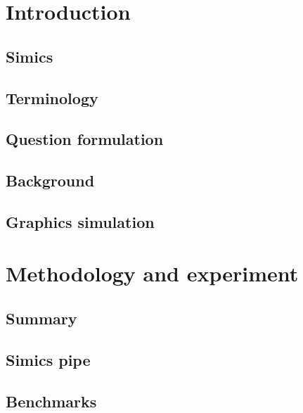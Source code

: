 \documentclass{beamer} %
\begin{document}
	

	\section{Introduction}

	\subsection{Simics}
	

        \subsection{Terminology}
        
        

	\subsection{Question formulation}
	

        \subsection{Background}
        
        

	\subsection{Graphics simulation}
	

        \section{Methodology and experiment}

        \subsection{Summary}
	

	\subsection{Simics pipe}
	

        \subsection{Benchmarks}
	
\end{document}
